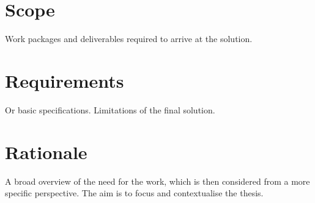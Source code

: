 \section{Scope}

Work packages and deliverables required to arrive at the solution.


\section{Requirements}

Or basic specifications. Limitations of the final solution.

\section{Rationale}

A broad overview of the need for the work, which is then considered from a more specific perspective. The aim is to focus and contextualise the thesis.

